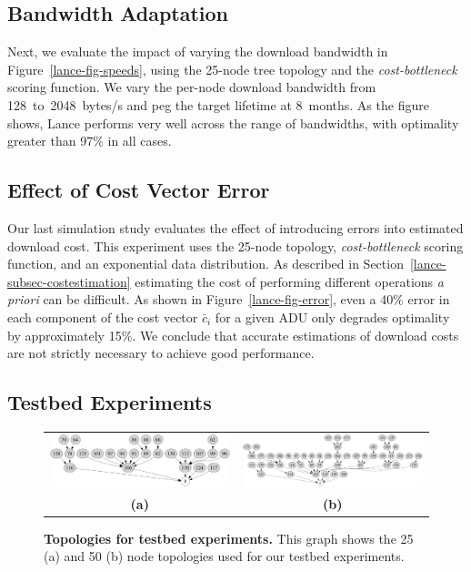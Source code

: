 \subsection{Bandwidth Adaptation}
\label{lance-sec-eval-params}

Next, we evaluate the impact of varying the download bandwidth in
Figure~\ref{lance-fig-speeds}, using the 25-node tree topology and the
\textit{cost-bottleneck} scoring function. We vary the per-node download
bandwidth from 128~to~2048~bytes/s and peg the target lifetime at 8~months.
As the figure shows, Lance performs very well across the range of bandwidths,
with optimality greater than 97\% in all cases.

\subsection{Effect of Cost Vector Error}

Our last simulation study evaluates the effect of introducing errors into
estimated download cost. This experiment uses the 25-node topology,
\textit{cost-bottleneck} scoring function, and an exponential data
distribution. As described in Section~\ref{lance-subsec-costestimation}
estimating the cost of performing different operations \textit{a priori} can
be difficult. As shown in Figure~\ref{lance-fig-error}, even a 40\% error in
each component of the cost vector $\bar{c}_i$ for a given ADU only degrades
optimality by approximately 15\%. We conclude that accurate estimations of
download costs are not strictly necessary to achieve good performance.

\subsection{Testbed Experiments}
\label{lance-sec-eval-policies}

\begin{figure}[t]
\begin{center}
\begin{tabular}{cc}
\includegraphics[width=0.45\hsize]{./4-lance/figs/topology25.pdf} &
\includegraphics[width=0.45\hsize]{./4-lance/figs/topology50.pdf} \\
\textbf{(a)} &
\textbf{(b)} \\
\end{tabular}
\end{center}

\caption{\textbf{Topologies for testbed experiments.} This graph shows the 25
(a) and 50 (b) node topologies used for our testbed experiments.}

\label{lance-fig-topology}
\end{figure}

